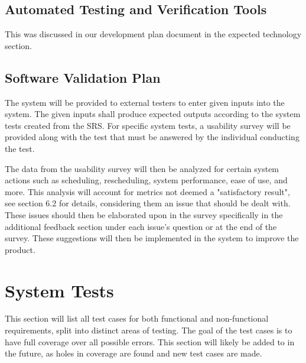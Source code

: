 \documentclass[12pt, titlepage]{article}
\begin{document}
\subsection{Automated Testing and Verification Tools}

This was discussed in our development plan document \cite{DP} 
in the expected technology section.

\subsection{Software Validation Plan}


The system will be provided to external testers to enter given inputs into the system. 
The given inputs shall produce expected outputs according to the system tests created 
from the SRS. For specific system tests, a usability survey will be provided along 
with the test that must be answered by the individual conducting the test.

The data from the usability survey will then be analyzed for certain system actions such as
scheduling, rescheduling, system performance, ease of use, and more. This analysis will account for
metrics not deemed a "satisfactory result", see section 6.2 for details, considering them
an issue that should be dealt with. These issues should then be elaborated upon in the
survey specifically in the additional feedback section under each issue's question or at the end
of the survey. These suggestions will then be implemented in the system to improve the product.

\section{System Tests}

This section will list all test cases for both functional and non-functional
requirements, split into distinct areas of testing. The goal of the test cases
is to have full coverage over all possible errors. This section will likely be
added to in the future, as holes in coverage are found and new test cases are
made.
\end{document}
